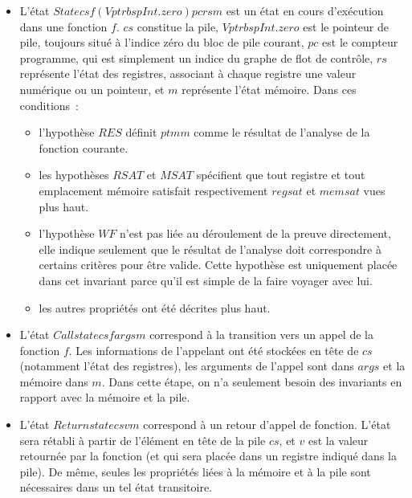 \documentclass{article}
\begin{document}
\begin{itemize}

\item L'état $State cs f (Vptr bsp Int.zero) pc rs m$ est un état
en cours d'exécution dans une fonction $f$. $cs$
constitue la pile, $Vptr bsp Int.zero$ est le pointeur de pile,
toujours situé à l'indice zéro du bloc de pile courant, $pc$ est le
compteur programme, qui est simplement un indice du graphe de flot de contrôle,
$rs$ représente l'état des registres, associant à chaque registre
une valeur numérique ou un pointeur, et $m$ représente l'état
mémoire. Dans ces conditions~:

\begin{itemize}

\item l'hypothèse $RES$ définit $ptmm$ comme le
résultat de l'analyse de la fonction courante.

\item les hypothèses $RSAT$ et $MSAT$ spécifient que
tout registre et tout emplacement mémoire satisfait respectivement
$regsat$ et $memsat$ vues plus haut.

\item l'hypothèse $WF$ n'est pas liée au déroulement de la preuve
directement, elle indique seulement que le résultat de l'analyse doit
correspondre à certains critères pour être valide. Cette hypothèse est
uniquement placée dans cet invariant parce qu'il est simple de la faire voyager
avec lui.

\item les autres propriétés ont été décrites plus haut.

\end{itemize}

\item L'état $Callstate cs f args m$ correspond à la transition
vers un appel de la fonction $f$. Les informations de l'appelant
ont été stockées en tête de $cs$ (notamment l'état des registres),
les arguments de l'appel sont dans $args$ et la mémoire dans
$m$. Dans cette étape, on n'a seulement besoin des invariants en
rapport avec la mémoire et la pile.

\item L'état $Returnstate cs v m$ correspond à un retour d'appel de
fonction. L'état sera rétabli à partir de l'élément en tête de la pile
$cs$, et $v$ est la valeur retournée par la fonction
(et qui sera placée dans un registre indiqué dans la pile). De même, seules les
propriétés liées à la mémoire et à la pile sont nécessaires dans un tel état
transitoire.

\end{itemize}
\end{document}
